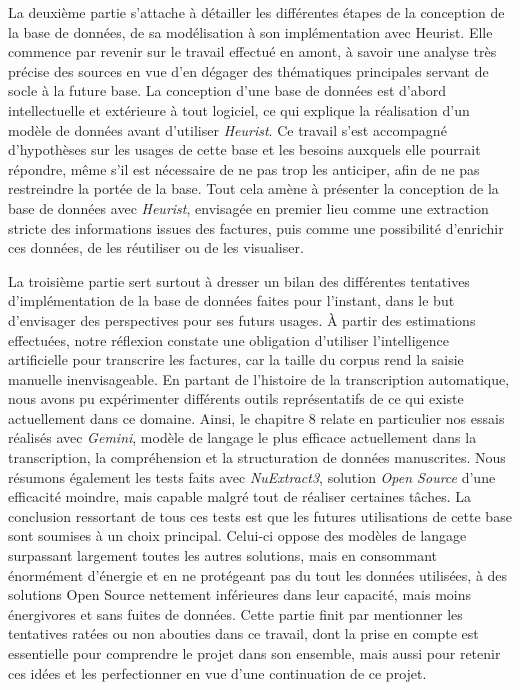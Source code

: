 \documentclass[12pt,twoside]{book}
\begin{document}
La deuxième partie s'attache à détailler les différentes étapes de la conception de la base de données, de sa modélisation à son implémentation avec Heurist. Elle commence par revenir sur le travail effectué en amont, à savoir une analyse très précise des sources en vue d'en dégager des thématiques principales servant de socle à la future base. La conception d'une base de données est d'abord intellectuelle et extérieure à tout logiciel, ce qui explique la réalisation d'un modèle de données avant d'utiliser \emph{Heurist}. Ce travail s'est accompagné d'hypothèses sur les usages de cette base et les besoins auxquels elle pourrait répondre, même s'il est nécessaire de ne pas trop les anticiper, afin de ne pas restreindre la portée de la base. Tout cela amène à présenter la conception de la base de données avec \emph{Heurist}, envisagée en premier lieu comme une extraction stricte des informations issues des factures, puis comme une possibilité d'enrichir ces données, de les réutiliser ou de les visualiser. 


La troisième partie sert surtout à dresser un bilan des différentes tentatives d'implémentation de la base de données faites pour l'instant, dans le but d'envisager des perspectives pour ses futurs usages. À partir des estimations effectuées, notre réflexion constate une obligation d'utiliser l'intelligence artificielle pour transcrire les factures, car la taille du corpus rend la saisie manuelle inenvisageable. En partant de l'histoire de la transcription automatique, nous avons pu expérimenter différents outils représentatifs de ce qui existe actuellement dans ce domaine. Ainsi, le chapitre 8 relate en particulier nos essais réalisés avec \emph{Gemini}, modèle de langage le plus efficace actuellement dans la transcription, la compréhension et la structuration de données manuscrites. Nous résumons également les tests faits avec \emph{NuExtract3}, solution \emph{Open Source} d'une efficacité moindre, mais capable malgré tout de réaliser certaines tâches. La conclusion ressortant de tous ces tests est que les futures utilisations de cette base sont soumises à un choix principal. Celui-ci oppose des modèles de langage surpassant largement toutes les autres solutions, mais en consommant énormément d'énergie et en ne protégeant pas du tout les données utilisées, à des solutions Open Source nettement inférieures dans leur capacité, mais moins énergivores et sans fuites de données. Cette partie finit par mentionner les tentatives ratées ou non abouties dans ce travail, dont la prise en compte est essentielle pour comprendre le projet dans son ensemble, mais aussi pour retenir ces idées et les perfectionner en vue d'une continuation de ce projet. 
\end{document}
